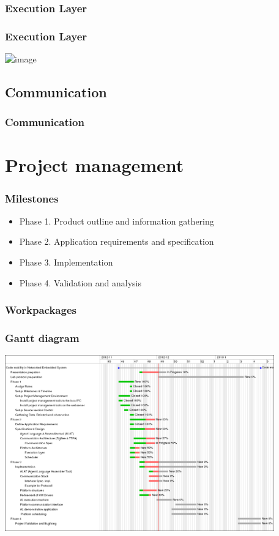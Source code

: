 \documentclass{beamer}
\theoremstyle{definition} \newtheorem{mdefinition}{Definition}
\theoremstyle{plain} \newtheorem{mtheorem}{Theorem}
\theoremstyle{plain} \newtheorem{mcorollary}{Corollary}
\theoremstyle{plain} \newtheorem{mfact}{Fact}
\begin{document}
\subsubsection{Execution Layer}
\begin{frame}
	\frametitle{Execution Layer}
\begin{center}
\includegraphics<1>[scale=0.29]{img/plat3} 
\end{center}


\end{frame}


\subsection{Communication}
\begin{frame}
	\frametitle{Communication}

\end{frame}

\section{Project management}
\begin{frame}
	\frametitle{Milestones}
	\begin{itemize}
	\item Phase 1. Product outline and information gathering 
	\item Phase 2. Application requirements and specification
	\item Phase 3. Implementation
	\item Phase 4. Validation and analysis
	\end{itemize}

\end{frame}

\begin{frame}
	\frametitle{Workpackages}
\end{frame}


\begin{frame}
	\frametitle{Gantt diagram}

\begin{center}
\includegraphics[height=3.0in]{img/gantt}

\end{center}
\end{frame}
\end{document}
